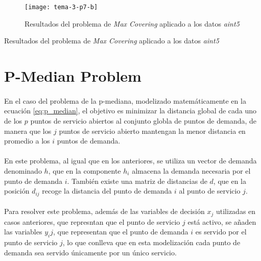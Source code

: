 \documentclass[spanish]{article}
\begin{document}
			\begin{figure}[h]
				\begin{center}
					\texttt{[image: tema-3-p7-b]}
				\end{center}
				\caption{Resultados del problema de \emph{Max Covering} aplicado a los datos \emph{aint5}}
				\label{fig:sol-7b}
			\end{figure}

			\begin{table}[h]
				\begin{center}
				\end{center}
				\caption{Resultados del problema de \emph{Max Covering} aplicado a los datos \emph{aint5}}
				\label{table:sol-7b}
			\end{table}

	\clearpage
	\section{P-Median Problem}
	\label{sec:e-8}

		\paragraph{}
		En el caso del problema de la p-mediana, modelizado matemáticamente en la ecuación \ref{eq:p_median}, el objetivo es minimizar la distancia global de cada uno de los $p$ puntos de servicio abiertos al conjunto globla de puntos de demanda, de manera que los $j$ puntos de servicio abierto mantengan la menor distancia en promedio a los $i$ puntos de demanda.

		\paragraph{}
		En este problema, al igual que en los anteriores, se utiliza un vector de demanda denominado $h$, que en la componente $h_{i}$ almacena la demanda necesaria por el punto de demanda $i$. También existe una matriz de distancias de $d$, que en la posición $d_{ij}$ recoge la distancia del punto de demanda $i$ al punto de servicio $j$.

		\paragraph{}
		Para resolver este problema, además de las variables de decisión $x_j$ utilizadas en casos anteriores, que represntan que el punto de servicio $j$ está activo, se añaden las variables $y_ij$, que representan que el punto de demanda $i$ es servido por el punto de servicio $j$, lo que conlleva que en esta modelización cada punto de demanda sea servido únicamente por un único servicio.
\end{document}
